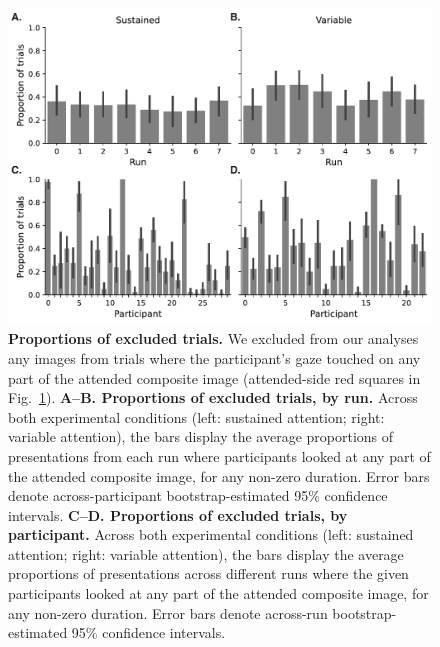 \documentclass{article}
\begin{document}
  \begin{figure}[tp]
	\centering
	\includegraphics[width=1\textwidth]{figs/gaze_intersections}
  
\caption{\textbf{Proportions of excluded trials.} We excluded from our analyses
any images from trials where the participant's gaze touched on any part of the
attended composite image (attended-side red squares in
Fig.~\ref{fig:gaze-histograms}). \textbf{A--B. Proportions of excluded trials,
by run.} Across both experimental conditions (left: sustained attention; right:
variable attention), the bars display the average proportions of presentations
from each run where participants looked at any part of the attended composite
image, for any non-zero duration. Error bars denote across-participant
bootstrap-estimated 95\% confidence intervals. \textbf{C--D. Proportions of
excluded trials, by participant.} Across both experimental conditions (left:
sustained attention; right: variable attention), the bars display the average
proportions of presentations across different runs where the given
participants looked at any part of the attended composite image, for any
non-zero duration. Error bars denote across-run bootstrap-estimated 95\%
confidence intervals.}

  \label{fig:gaze-histograms}
\end{figure}
\end{document}
